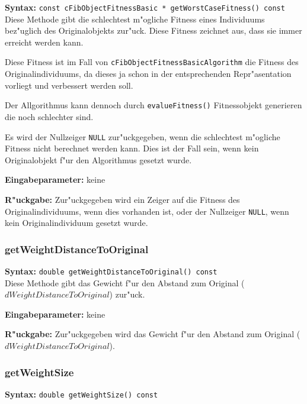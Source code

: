 \textbf{Syntax:} \verb|const cFibObjectFitnessBasic * getWorstCaseFitness() const| \\

Diese Methode gibt die schlechtest m"ogliche Fitness eines Individuums bez"uglich des Originalobjekts zur"uck. Diese Fitness zeichnet aus, dass sie immer erreicht werden kann.

Diese Fitness ist im Fall von \verb|cFibObjectFitnessBasicAlgorithm| die Fitness des Originalindividuums, da dieses ja schon in der entsprechenden Repr"asentation vorliegt und verbessert werden soll.

Der Allgorithmus kann dennoch durch \verb|evalueFitness()| Fitnessobjekt generieren die noch schlechter sind.

Es wird der Nullzeiger \verb|NULL| zur"uckgegeben, wenn die schlechtest m"ogliche Fitness nicht berechnet werden kann. Dies ist der Fall sein, wenn kein Originalobjekt f"ur den Algorithmus gesetzt wurde.

\bigskip\noindent
\textbf{Eingabeparameter:} keine

\bigskip\noindent
\textbf{R"uckgabe:} Zur"uckgegeben wird ein Zeiger auf die Fitness des Originalindividuums, wenn dies vorhanden ist, oder der Nullzeiger \verb|NULL|, wenn kein Originalindividuum gesetzt wurde.


\subsubsection{getWeightDistanceToOriginal}

\textbf{Syntax:} \verb|double getWeightDistanceToOriginal() const| \\

Diese Methode gibt das Gewicht f"ur den Abstand zum Original ($dWeightDistanceToOriginal$) zur"uck.

\bigskip\noindent
\textbf{Eingabeparameter:} keine

\bigskip\noindent
\textbf{R"uckgabe:} Zur"uckgegeben wird das Gewicht f"ur den Abstand zum Original ($dWeightDistanceToOriginal$).


\subsubsection{getWeightSize}

\textbf{Syntax:} \verb|double getWeightSize() const| \\

